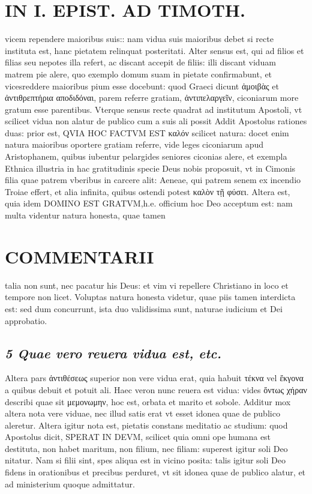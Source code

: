 \documentclass{article}
\begin{document}
\begin{pages}
\section*{IN I. EPIST. AD TIMOTH. }
\marginpar{[ p.123 ]}\pstart vicem rependere maioribus suis:: nam vidua suis maioribus debet si recte instituta est, hanc pietatem relinquat posteritati. Alter sensus est, qui ad filios et filias seu nepotes illa refert, ac discant accepit de filiis: illi discant viduam matrem pie alere, quo exemplo domum suam in pietate confirmabunt, et vicesreddere maioribus pium esse docebunt: quod Graeci dicunt ἁμοιβὰς et ἀντιθρεπτήρια αποδιδόναι, parem referre gratiam, ἀντιπελαργεῖν, ciconiarum more gratum esse parentibus. Vterque sensus recte quadrat ad institutum Apostoli, vt scilicet vidua non alatur de publico cum a suis ali possit  \pend\pstart Addit Apostolus rationes duas: prior est, QVIA HOC FACTVM EST καλόν scilicet natura: docet enim natura maioribus oportere gratiam referre, vide leges ciconiarum apud Aristophanem, quibus iubentur pelargides seniores ciconias alere, et exempla Ethnica illustria in hac gratitudinis specie Deus nobis proposuit, vt in Cimonis filia quae patrem vberibus in carcere alit: Aeneae, qui patrem senem ex incendio Troiae effert, et alia infinita, quibus ostendi potest καλὸν τῇ φύσει.  \pend\pstart Altera est, quia idem DOMINO EST GRATVM,h.e. officium hoc Deo acceptum est: nam multa videntur natura honesta, quae tamen  \pend
\section*{COMMENTARII }
\marginpar{[ p.124 ]}\pstart talia non sunt, nec pacatur his Deus: et vim vi repellere Christiano in loco et tempore non licet. Voluptas natura honesta videtur, quae piis tamen interdicta est: sed dum concurrunt, ista duo validissima sunt, naturae iudicium et Dei approbatio.  \pend
{}
{}
\subsection*{\textit{5 Quae vero reuera vidua est, etc. }}\pstart Altera pars ἀντιθέσεως superior non vere vidua erat, quia habuit τέκνα vel ἔκγονα a quibus debuit et potuit ali. Haec veron nunc reuera est vidua: vides ὄντως χήραν describi quae sit μεμονωμην, hoc est, orbata et marito et sobole. Additur mox altera nota vere viduae, nec illud satis erat vt esset idonea quae de publico aleretur. Altera igitur nota est, pietatis constans meditatio ac studium: quod Apostolus dicit, SPERAT IN DEVM, scilicet quia omni ope humana est destituta, non habet maritum, non filium, nec filiam: superest igitur soli Deo nitatur. Nam si filii sint, spes aliqua est in vicino posita: talis igitur soli Deo fidens in orationibus et precibus perduret, vt sit idonea quae de publico alatur, et ad ministerium quoque admittatur.  \pend
{}
{}

\end{pages}
\end{document}
